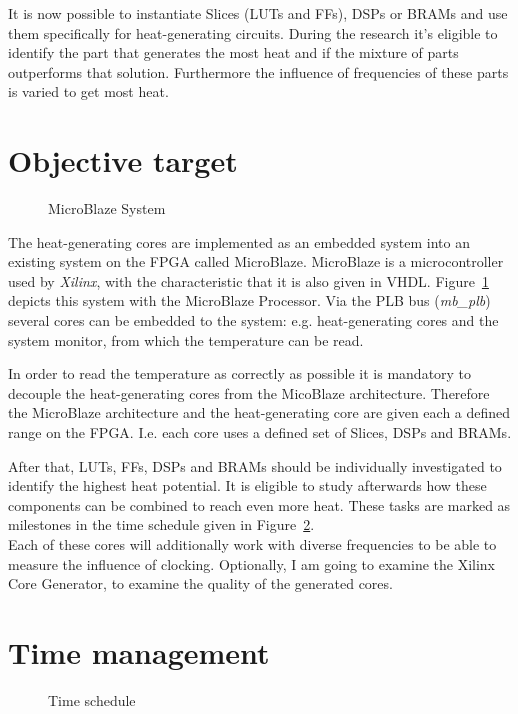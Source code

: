 \documentclass[12pt,twoside,doublepage]{article}
\begin{document}
It is now possible to instantiate Slices (LUTs and FFs), DSPs or BRAMs and use them specifically for heat-generating circuits. During the research it's eligible to identify the part that generates the most heat and if the mixture of parts outperforms that solution.
Furthermore the influence of frequencies of these parts is varied to get most heat. 

\section{Objective target}
\label{sec:target}

\begin{figure}[H]
	\caption{MicroBlaze System}
	\label{fig:microblaze}
\end{figure}

The heat-generating cores are implemented as an embedded system into an existing system on the FPGA called MicroBlaze. MicroBlaze is a microcontroller used by \textit{Xilinx}, with the characteristic that it is also given in VHDL. Figure~\ref{fig:microblaze} depicts this system with the MicroBlaze Processor. Via the PLB bus (\textit{mb\_plb}) several cores can be embedded to the system: e.g. heat-generating cores and the system monitor, from which the temperature can be read.

In order to read the temperature as correctly as possible it is mandatory to decouple the heat-generating cores from the MicoBlaze architecture. Therefore the MicroBlaze architecture and the heat-generating core are given each a defined range on the FPGA. I.e. each core uses a defined set of Slices, DSPs and BRAMs.

After that, LUTs, FFs, DSPs and BRAMs should be individually investigated to identify the highest heat potential. 
It is eligible to study afterwards how these components can be combined to reach even more heat. These tasks are marked as milestones in the time schedule given in Figure~\ref{fig:schedule}.
\\ Each of these cores will additionally work with diverse frequencies to be able to measure the influence of clocking. Optionally, I am going to examine the Xilinx Core Generator, to examine the quality of the generated cores.

\section{Time management}
\label{sec:time}

\begin{figure}[H]
	\caption{Time schedule}
	\label{fig:schedule}
\end{figure}




\end{document}
